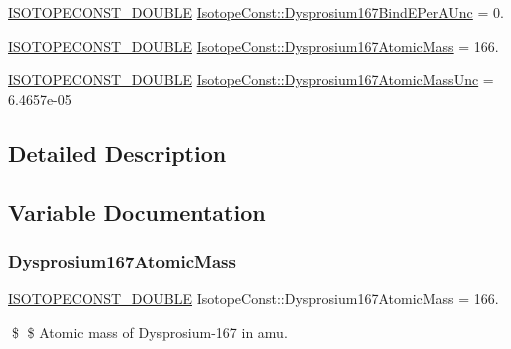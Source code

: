 \begin{DoxyCompactItemize}
\item 
\mbox{\hyperlink{group___isotope_const-_macros_ga8f45a7272ce02c0b4c65c44636ed719a}{I\+S\+O\+T\+O\+P\+E\+C\+O\+N\+S\+T\+\_\+\+D\+O\+U\+B\+LE}} \mbox{\hyperlink{group___isotope_const-_dysprosium-_dy167_ga01cf2657ec0ef7d6fecad5dd5c1929ca}{Isotope\+Const\+::\+Dysprosium167\+Bind\+E\+Per\+A\+Unc}} = 0.
\item 
\mbox{\hyperlink{group___isotope_const-_macros_ga8f45a7272ce02c0b4c65c44636ed719a}{I\+S\+O\+T\+O\+P\+E\+C\+O\+N\+S\+T\+\_\+\+D\+O\+U\+B\+LE}} \mbox{\hyperlink{group___isotope_const-_dysprosium-_dy167_gaeb83d35dd81b8190dd399ae70e8f06db}{Isotope\+Const\+::\+Dysprosium167\+Atomic\+Mass}} = 166.
\item 
\mbox{\hyperlink{group___isotope_const-_macros_ga8f45a7272ce02c0b4c65c44636ed719a}{I\+S\+O\+T\+O\+P\+E\+C\+O\+N\+S\+T\+\_\+\+D\+O\+U\+B\+LE}} \mbox{\hyperlink{group___isotope_const-_dysprosium-_dy167_ga0065d6f3fd32b08348d5d20c350c7807}{Isotope\+Const\+::\+Dysprosium167\+Atomic\+Mass\+Unc}} = 6.\+4657e-\/05
\end{DoxyCompactItemize}


\subsection{Detailed Description}


\subsection{Variable Documentation}
\mbox{\label{group___isotope_const-_dysprosium-_dy167_gaeb83d35dd81b8190dd399ae70e8f06db}} 
\subsubsection{\texorpdfstring{Dysprosium167\+Atomic\+Mass}{Dysprosium167AtomicMass}}
{\footnotesize\ttfamily \mbox{\hyperlink{group___isotope_const-_macros_ga8f45a7272ce02c0b4c65c44636ed719a}{I\+S\+O\+T\+O\+P\+E\+C\+O\+N\+S\+T\+\_\+\+D\+O\+U\+B\+LE}} Isotope\+Const\+::\+Dysprosium167\+Atomic\+Mass = 166.}

\$ \$ Atomic mass of Dysprosium-\/167 in amu. \mbox{\label{group___isotope_const-_dysprosium-_dy167_ga0065d6f3fd32b08348d5d20c350c7807}} 
